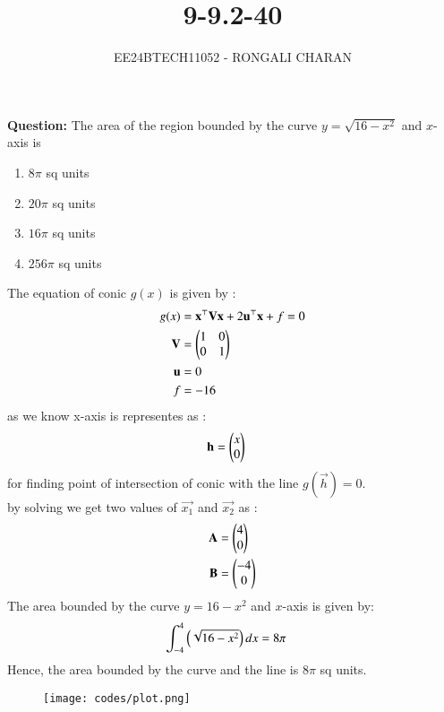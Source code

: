 \documentclass[journal,12pt,onecolumn]{IEEEtran}
\theoremstyle{remark}
\begin{document}

\vspace{3cm}
\title{9-9.2-40}
\author{EE24BTECH11052 - RONGALI CHARAN}
{\let\newpage\relax\maketitle}

\renewcommand{\thefigure}{\theenumi}
\renewcommand{\thetable}{\theenumi}
\setlength{\intextsep}{10pt} %


\renewcommand{\thetable}{\theenumi}
\textbf{Question:} The area of the region bounded by the curve $y=\sqrt{16-x^2}$ and $x$-axis is
\begin{enumerate}
\item $8\pi$ sq units
\item $20\pi$ sq units
\item $16\pi$ sq units
\item $256\pi$ sq units
\end{enumerate}
\solution
The equation of conic $g(x)$ is given by :
\begin{align}
	g(x) &= \mathbf{x}^\top \mathbf{V}\mathbf{x}+2\mathbf{u}^\top \mathbf{x}+f=0\\
	\mathbf{V} &= \begin{pmatrix}1 & 0\\0 & 1\end{pmatrix}\\
	\mathbf{u} &= 0 \\
	f &= -16
       \end{align}
       as we know x-axis is representes as :
\begin{align}
	\mathbf{h} &= \begin{pmatrix}x \\ 0\end{pmatrix}
\end{align}
for finding point of intersection of conic with the line $g(\vec{h})=0$.\\
by solving we get two values of $\vec{x_1}$ and $\vec{x_2}$ as :
\begin{align}
	\mathbf{A} &= \begin{pmatrix}4 \\0\end{pmatrix}\\
	\mathbf{B} &= \begin{pmatrix}-4\\0\end{pmatrix}
\end{align}
The area bounded by the curve $y = 16-x^2$ and $x$-axis is given by:
\begin{align}
	\int_{-4}^{4}\left(\sqrt{16-x^2} \right)dx &= 8\pi 
\end{align}
Hence, the area bounded by the curve and the line is $8\pi$ sq units.\\
\begin{figure}[h]
	\centering
	\texttt{[image: codes/plot.png]}
	\label{Fig}
\end{figure}
\end{document}
